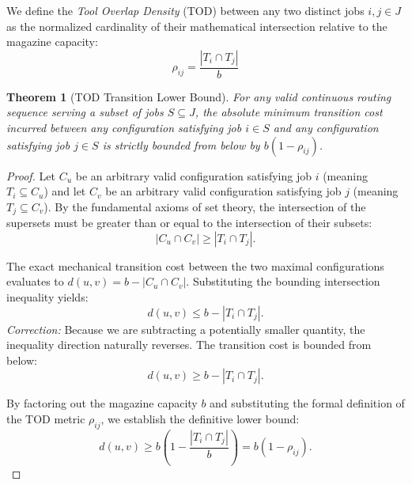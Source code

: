 \documentclass[11pt, a4paper]{book}
\newtheorem{theorem}{Theorem}[chapter]
\begin{document}
	We define the \textit{Tool Overlap Density} (TOD) between any two distinct jobs $i, j \in J$ as the normalized cardinality of their mathematical intersection relative to the magazine capacity:
	\begin{equation}
		\rho_{ij} = \frac{|T_i \cap T_j|}{b}
	\end{equation}
	
	\begin{theorem}[TOD Transition Lower Bound]
		For any valid continuous routing sequence serving a subset of jobs $S \subseteq J$, the absolute minimum transition cost incurred between any configuration satisfying job $i \in S$ and any configuration satisfying job $j \in S$ is strictly bounded from below by $b(1 - \rho_{ij})$.
	\end{theorem}
	
	\begin{proof}
		Let $C_u$ be an arbitrary valid configuration satisfying job $i$ (meaning $T_i \subseteq C_u$) and let $C_v$ be an arbitrary valid configuration satisfying job $j$ (meaning $T_j \subseteq C_v$). By the fundamental axioms of set theory, the intersection of the supersets must be greater than or equal to the intersection of their subsets:
		\begin{equation}
			|C_u \cap C_v| \ge |T_i \cap T_j|.
		\end{equation}
		
		The exact mechanical transition cost between the two maximal configurations evaluates to $d(u,v) = b - |C_u \cap C_v|$. Substituting the bounding intersection inequality yields:
		\begin{equation}
			d(u,v) \le b - |T_i \cap T_j|. \label{eq:tod_flawed}
		\end{equation}
		\textit{Correction:} Because we are subtracting a potentially smaller quantity, the inequality direction naturally reverses. The transition cost is bounded from below:
		\begin{equation}
			d(u,v) \ge b - |T_i \cap T_j|.
		\end{equation}
		
		By factoring out the magazine capacity $b$ and substituting the formal definition of the TOD metric $\rho_{ij}$, we establish the definitive lower bound:
		\begin{equation}
			d(u,v) \ge b \left( 1 - \frac{|T_i \cap T_j|}{b} \right) = b(1 - \rho_{ij}).
		\end{equation}
	\end{proof}
	
\end{document}
